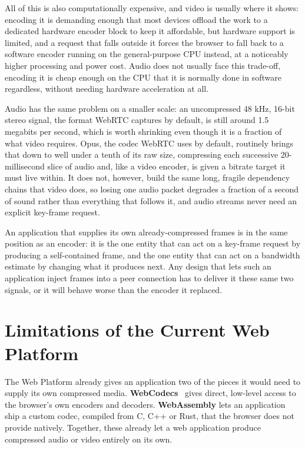 \documentclass[11pt]{article}
\begin{document}
All of this is also computationally expensive, and video is usually where it shows: encoding it is demanding enough that most devices offload the work to a dedicated hardware encoder block to keep it affordable, but hardware support is limited, and a request that falls outside it forces the browser to fall back to a software encoder running on the general-purpose CPU instead, at a noticeably higher processing and power cost. Audio does not usually face this trade-off, encoding it is cheap enough on the CPU that it is normally done in software regardless, without needing hardware acceleration at all.

Audio has the same problem on a smaller scale: an uncompressed 48 kHz, 16-bit stereo signal, the format WebRTC captures by default, is still around 1.5 megabits per second, which is worth shrinking even though it is a fraction of what video requires. Opus, the codec WebRTC uses by default, routinely brings that down to well under a tenth of its raw size, compressing each successive 20-millisecond slice of audio and, like a video encoder, is given a bitrate target it must live within. It does not, however, build the same long, fragile dependency chains that video does, so losing one audio packet degrades a fraction of a second of sound rather than everything that follows it, and audio streams never need an explicit key-frame request.

An application that supplies its own already-compressed frames is in the same position as an encoder: it is the one entity that can act on a key-frame request by producing a self-contained frame, and the one entity that can act on a bandwidth estimate by changing what it produces next. Any design that lets such an application inject frames into a peer connection has to deliver it these same two signals, or it will behave worse than the encoder it replaced.

\section{Limitations of the Current Web Platform}
\label{sec:limitations}

The Web Platform already gives an application two of the pieces it would need to supply its own compressed media. \textbf{WebCodecs}~\cite{webcodecs} gives direct, low-level access to the browser's own encoders and decoders. \textbf{WebAssembly} lets an application ship a custom codec, compiled from C, C++ or Rust, that the browser does not provide natively. Together, these already let a web application produce compressed audio or video entirely on its own.
\end{document}
